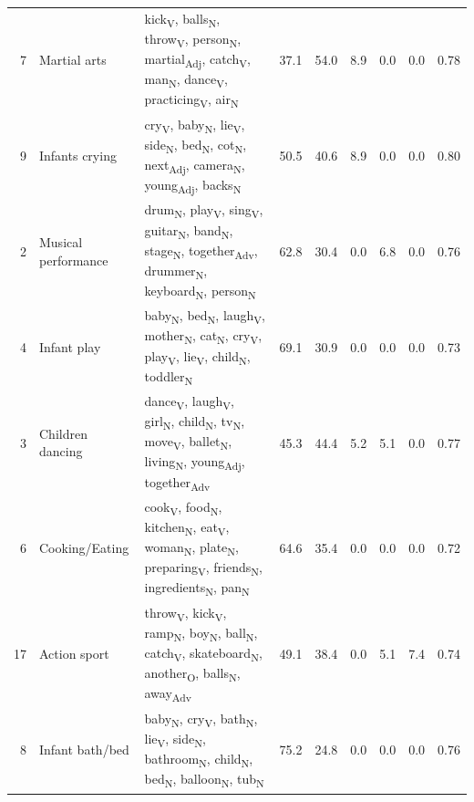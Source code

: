 \begin{landscape}
\begin{xltabular}{\linewidth}{r >{\raggedright\arraybackslash}p{2.9cm} >{\raggedright\arraybackslash}X r r r r r r}
7 & Martial arts & kick\textsubscript{V}, balls\textsubscript{N}, throw\textsubscript{V}, person\textsubscript{N}, martial\textsubscript{Adj}, catch\textsubscript{V}, man\textsubscript{N}, dance\textsubscript{V}, practicing\textsubscript{V}, air\textsubscript{N} & 37.1 & 54.0 & 8.9 & 0.0 & 0.0 & 0.78 \\
9 & Infants crying & cry\textsubscript{V}, baby\textsubscript{N}, lie\textsubscript{V}, side\textsubscript{N}, bed\textsubscript{N}, cot\textsubscript{N}, next\textsubscript{Adj}, camera\textsubscript{N}, young\textsubscript{Adj}, backs\textsubscript{N} & 50.5 & 40.6 & 8.9 & 0.0 & 0.0 & 0.80 \\
2 & Musical performance & drum\textsubscript{N}, play\textsubscript{V}, sing\textsubscript{V}, guitar\textsubscript{N}, band\textsubscript{N}, stage\textsubscript{N}, together\textsubscript{Adv}, drummer\textsubscript{N}, keyboard\textsubscript{N}, person\textsubscript{N} & 62.8 & 30.4 & 0.0 & 6.8 & 0.0 & 0.76 \\
4 & Infant play & baby\textsubscript{N}, bed\textsubscript{N}, laugh\textsubscript{V}, mother\textsubscript{N}, cat\textsubscript{N}, cry\textsubscript{V}, play\textsubscript{V}, lie\textsubscript{V}, child\textsubscript{N}, toddler\textsubscript{N} & 69.1 & 30.9 & 0.0 & 0.0 & 0.0 & 0.73 \\
3 & Children dancing & dance\textsubscript{V}, laugh\textsubscript{V}, girl\textsubscript{N}, child\textsubscript{N}, tv\textsubscript{N}, move\textsubscript{V}, ballet\textsubscript{N}, living\textsubscript{N}, young\textsubscript{Adj}, together\textsubscript{Adv} & 45.3 & 44.4 & 5.2 & 5.1 & 0.0 & 0.77 \\
6 & Cooking/Eating & cook\textsubscript{V}, food\textsubscript{N}, kitchen\textsubscript{N}, eat\textsubscript{V}, woman\textsubscript{N}, plate\textsubscript{N}, preparing\textsubscript{V}, friends\textsubscript{N}, ingredients\textsubscript{N}, pan\textsubscript{N} & 64.6 & 35.4 & 0.0 & 0.0 & 0.0 & 0.72 \\
17 & Action sport & throw\textsubscript{V}, kick\textsubscript{V}, ramp\textsubscript{N}, boy\textsubscript{N}, ball\textsubscript{N}, catch\textsubscript{V}, skateboard\textsubscript{N}, another\textsubscript{O}, balls\textsubscript{N}, away\textsubscript{Adv} & 49.1 & 38.4 & 0.0 & 5.1 & 7.4 & 0.74 \\
8 & Infant bath/bed & baby\textsubscript{N}, cry\textsubscript{V}, bath\textsubscript{N}, lie\textsubscript{V}, side\textsubscript{N}, bathroom\textsubscript{N}, child\textsubscript{N}, bed\textsubscript{N}, balloon\textsubscript{N}, tub\textsubscript{N} & 75.2 & 24.8 & 0.0 & 0.0 & 0.0 & 0.76 \\

\end{xltabular}
\end{landscape}
